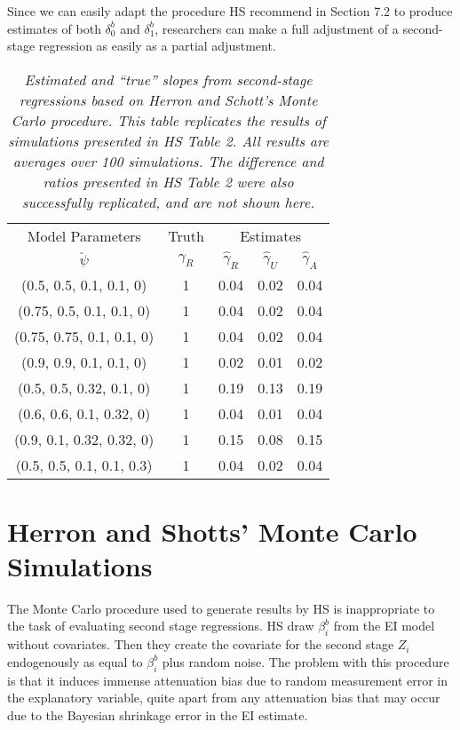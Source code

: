 \documentclass[11pt,titlepage]{article}
\begin{document}
Since we can easily adapt the procedure HS recommend in Section 7.2
to produce estimates of both $\delta_0^b$ and $\delta_1^b$, researchers
can make a full adjustment of a second-stage regression as easily as a
partial adjustment.
\begin{table}[tb]
\label{t:hsrep}
\begin{center}
\begin{tabular}{cc|c c c}
Model Parameters & Truth & \multicolumn{3}{c}{Estimates} \\
$\breve\psi$  & $\gamma_R$ & $\hat\gamma_R$  &       $\hat\gamma_U$ & $\hat\gamma_A$ \\\hline
(0.5, 0.5, 0.1, 0.1, 0)&1 &       0.04    &       0.02    &       0.04        \\
(0.75, 0.5, 0.1, 0.1, 0) &1       &       0.04    &       0.02    &       0.04        \\
(0.75, 0.75, 0.1, 0.1, 0) &1      &       0.04    &       0.02    &       0.04     \\
(0.9, 0.9, 0.1, 0.1, 0) &1&       0.02    &       0.01    &       0.02          \\
(0.5, 0.5, 0.32, 0.1, 0) &1       &       0.19    &       0.13    &       0.19        \\
(0.6, 0.6, 0.1, 0.32, 0) &1       &       0.04    &       0.01    &       0.04     \\
(0.9, 0.1, 0.32, 0.32, 0)&1       &       0.15    &       0.08    &       0.15        \\
(0.5, 0.5, 0.1, 0.1, 0.3)&1       &       0.04    &       0.02    &       0.04     \\
\hline
\end{tabular}
\end{center}
\caption{\em Estimated and ``true'' slopes from 
second-stage regressions based on Herron and Schott's Monte Carlo 
procedure. This table replicates the results of simulations presented in
HS Table 2.  All results are averages over 100 simulations.  
The difference and ratios presented in HS Table 2 were also 
successfully replicated, and are not shown here.}
\end{table}

\section{Herron and Shotts' Monte Carlo Simulations}

The Monte Carlo procedure used to generate results by HS is
inappropriate to the task of evaluating second stage regressions.  HS
draw $\beta_i^b$ from the EI model without covariates.  Then they
create the covariate for the second stage $Z_i$ endogenously as equal
to $\beta_i^b$ plus random noise.  The problem with this procedure is
that it induces immense attenuation bias due to random measurement
error in the explanatory variable, quite apart from any attenuation
bias that may occur due to the Bayesian shrinkage error in the EI
estimate.
\end{document}

